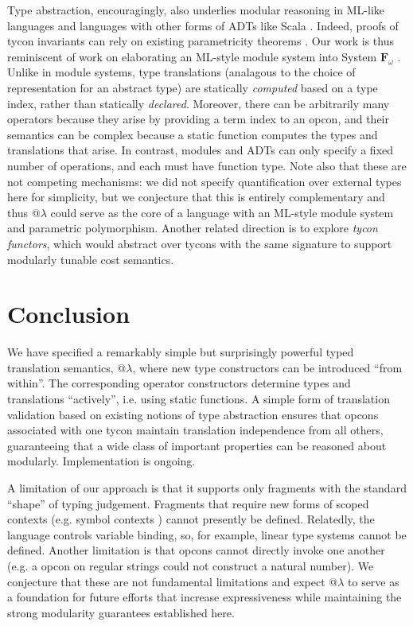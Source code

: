 \documentclass[pldi]{sigplanconf-pldi15}
\begin{document}
Type abstraction, encouragingly, also underlies modular reasoning in ML-like languages \cite{pfpl,harper1997programming} and languages with other forms of ADTs \cite{liskov1974programming} like Scala \cite{conf/oopsla/AminRO14}. Indeed, proofs of tycon invariants can rely on existing parametricity theorems \cite{WadlerThms}. 
Our work is thus reminiscent of  work on elaborating an ML-style module system into System $\mathbf{F}_\omega$ \cite{conf/tldi/RossbergRD10}.  Unlike in module systems, type translations (analagous to the choice of representation for an abstract type) are statically \emph{computed} based on a type index, rather than statically \emph{declared}. Moreover, there can be arbitrarily many operators because they arise by providing a term index to an opcon, and their  semantics can be complex because a static function computes the types and translations that arise. In contrast, modules and ADTs can only specify a fixed number of operations, and each must have function type. Note also that these are not competing mechanisms: we did not specify quantification over external types here for simplicity, but we conjecture that this is entirely complementary and thus @$\lambda$ could serve as the core of a language with an ML-style module system and parametric polymorphism. Another related direction is to explore \emph{tycon functors}, which would abstract over tycons with the same signature to support modularly tunable cost semantics. %


\section{Conclusion}
\noindent We have specified a remarkably simple but surprisingly powerful typed translation semantics, @$\lambda$, where new type constructors can be introduced ``from within''. The corresponding operator constructors determine types and translations ``actively'', i.e. using static functions. A simple form of translation validation based on existing notions of type abstraction  ensures that opcons associated with one tycon maintain translation independence from all others, guaranteeing that a wide class of important properties can be reasoned about modularly. Implementation is ongoing.

A limitation of our approach is that it supports only  fragments with the standard ``shape'' of typing judgement. Fragments that require new forms of scoped contexts (e.g. symbol contexts \cite{pfpl}) cannot presently be defined. Relatedly, the language controls variable binding, so, for example, linear  type systems cannot be defined. Another limitation is that opcons cannot directly invoke one another (e.g. a  opcon on regular strings could not construct a natural number). We conjecture that these are not fundamental limitations and expect @$\lambda$ to serve as a  foundation for future efforts that increase  expressiveness while maintaining the strong modularity guarantees established  here. %
\end{document}
